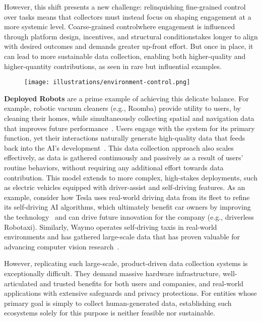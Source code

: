 However, this shift presents a new challenge: relinquishing fine-grained control over tasks means that collectors must instead focus on shaping engagement at a more systemic level. Coarse-grained control\textemdash{}where engagement is influenced through platform design, incentives, and structural conditions\textemdash{}takes longer to align with desired outcomes and demands greater up-front effort. But once in place, it can lead to more sustainable data collection, enabling both higher-quality and higher-quantity contributions, as seen in rare but influential examples.

\begin{figure}[h]
    \centering
    \texttt{[image: illustrations/environment-control.png]}
    \label{fig:environment-control}
\end{figure}

\textbf{Deployed Robots} are a prime example of achieving this delicate balance. For example, robotic vacuum cleaners (e.g., Roomba) provide utility to users, by cleaning their homes, while simultaneously collecting spatial and navigation data that improves future performance~\cite{astor2017your}. Users engage with the system for its primary function, yet their interactions naturally generate high-quality data that feeds back into the AI’s development~\cite{brynjolfsson2014second}. This data collection approach also scales effectively, as data is gathered continuously and passively as a result of users' routine behaviors, without requiring any additional effort towards data contribution. This model extends to more complex, high-stakes deployments, such as electric vehicles equipped with driver-assist and self-driving features. As an example, consider how Tesla uses real-world driving data from its fleet to refine its self-driving AI algorithms, which ultimately benefit car owners by improving the technology~\cite{karpathy2021ai,tesla_autopilot} and can drive future innovation for the company (e.g., driverless Robotaxi). Similarly, Waymo operates self-driving taxis in real-world environments and has gathered large-scale data that has proven valuable for advancing computer vision research~\cite{sun2020scalability}.

However, replicating such large-scale, product-driven data collection systems is exceptionally difficult. They demand massive hardware infrastructure, well-articulated and trusted benefits for both users and companies, and real-world applications with extensive safeguards and privacy protections. For entities whose primary goal is simply to collect human-generated data, establishing such ecosystems solely for this purpose is neither feasible nor sustainable.

